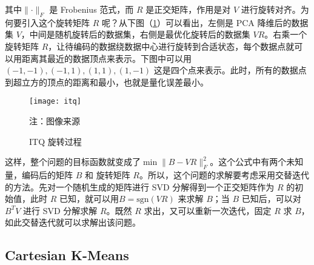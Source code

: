 其中$\lVert \cdot \rVert_F$ 是 Frobenius 范式，而 $R$ 是正交矩阵，作用是对 $V$ 进行旋转对齐。为何要引入这个旋转矩阵 $R$ 呢？从下图（\ref{fig:itq}）可以看出，左侧是 PCA 降维后的数据集 $V$，中间是随机旋转后的数据集，右侧是最优化旋转后的数据集 $VR$。右乘一个旋转矩阵 $R$，让待编码的数据绕数据中心进行旋转到合适状态，每个数据点就可以用距离其最近的数据顶点来表示。下图中可以用 $(-1, -1), (-1, 1), (1, 1), (1, -1) $ 这是四个点来表示。此时，所有的数据点到超立方的顶点的距离和最小，也就是量化误差最小。
\begin{figure}[H]
  \centering
  \texttt{[image: itq]}
  \caption{ITQ 旋转过程}
  \label{fig:itq}
  \footnotesize 注：图像来源\cite{YunchaoGong:2011:IQP:2191740.2191779}
\end{figure}
这样，整个问题的目标函数就变成了$\min \lVert B - VR \rVert_F ^2$。这个公式中有两个未知量，编码后的矩阵 $B$ 和 旋转矩阵 $R$。所以，这个问题的求解要考虑采用交替迭代的方法。先对一个随机生成的矩阵进行 SVD 分解得到一个正交矩阵作为 $R$ 的初始值，此时 $R$ 已知，就可以用$ B= \mathrm{sgn}(VR)$ 来求解 $B$；当 $B$ 已知后，可以对 $B^TV$ 进行 SVD 分解求解 $R$。既然 $R$ 求出，又可以重新一次迭代，固定 $R$ 求 $B$，如此交替迭代就可以求解出该问题。
\subsection{Cartesian K-Means}

